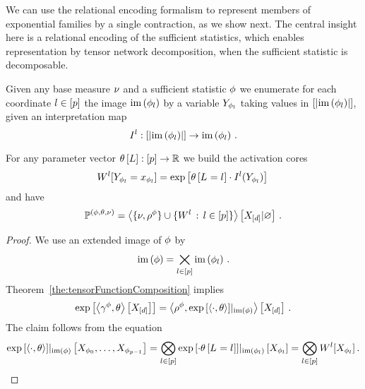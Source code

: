 
We can use the relational encoding formalism to represent members of exponential families by a single contraction, as we show next.
The central insight here is a relational encoding of the sufficient statistics, which enables representation by tensor network decomposition, when the sufficient statistic is decomposable.

\begin{theorem}\label{def:expFamilyTensorRep}
	Given any base measure $\nu$ and a sufficient statistic $\phi$ we enumerate for each coordinate $l\in[p]$ the image $\mathrm{im}\left(\phi_{l}\right)$ by a variable $Y_{\phi_{l}}$ taking values in $[\left|\mathrm{im}\left(\phi_{l}\right)\right|]$, given an interpretation map
		\[ I^{l} : 
		[\left|\mathrm{im}\left(\phi_{l}\right)\right|] \rightarrow \mathrm{im}\left(\phi_{l}\right) \, . \]
	
	For any parameter vector $\theta\left[L\right]:[p]\rightarrow\mathbb{R}$ we build the activation cores
		\[ W^{l}[Y_{\phi_{l}}=x_{\phi_{l}}]
		= \mathrm{exp}\left[\theta\left[L_{}=l_{}\right] \cdot I^{l}(Y_{\phi_{l}}) \right] \,   \]
	and have
		\[ \mathbb{P}^{(\phi,\theta,\nu)} = 
		\left\langle \{\nu,\rho^{\phi}\}\cup\{W^{l} \, : \, l\in[p]\}\right\rangle \left[ X_{[d]} | \varnothing \right] \, .
		\]
\end{theorem}
\begin{proof}
	We use an extended image of $\phi$ by  %
		\[ \mathrm{im}\left(\phi\right) = \bigtimes_{l\in[p]} \mathrm{im}\left(\phi_{l}\right) \, . \]
	Theorem~\ref{the:tensorFunctionComposition} implies
		\[ \mathrm{exp}\left[\left\langle \gamma^{\phi},\theta\right\rangle \left[ X_{[d]} \right]\right]
		= \left\langle \rho^{\phi}, {\mathrm{exp}\left[\braket{\cdot, \theta}\right]}|_{\mathrm{im}\left(\phi\right)}\right\rangle \left[ X_{[d]} \right] \, . \]
	The claim follows from the equation
		\[ {\mathrm{exp}\left[\braket{\cdot, \theta}\right]}|_{\mathrm{im}\left(\phi\right)}\left[X_{\phi_{0}},\ldots,X_{\phi_{p-1}}\right]
		= \bigotimes_{l\in[p]} {\mathrm{exp}\left[\cdot \theta\left[L_{}=l_{}\right]\right]}|_{\mathrm{im}\left(\phi_{l}\right)}\left[X_{\phi_{l}}\right]
		= \bigotimes_{l\in[p]} W^{l}[X_{\phi_{l}}] \, . \]
\end{proof}


